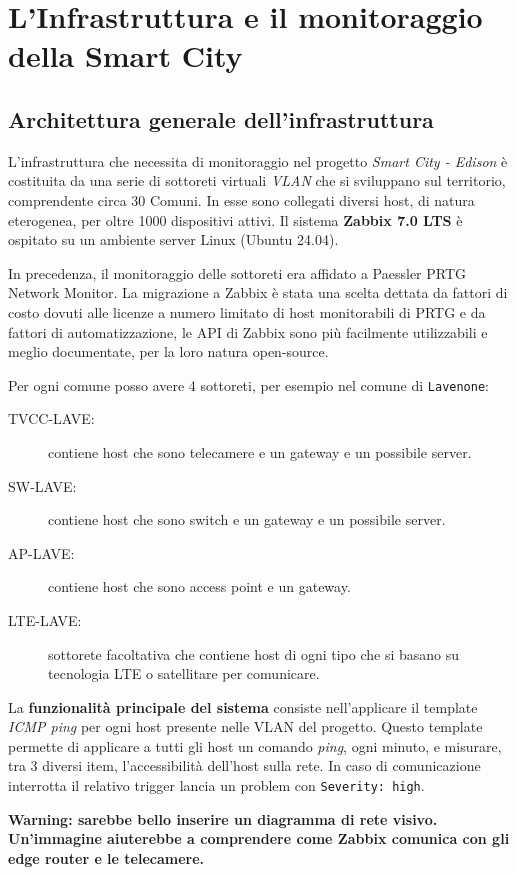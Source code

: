 \documentclass[12pt, a4paper]{report}
\begin{document}
\chapter{L'Infrastruttura e il  monitoraggio della Smart City}

\section{Architettura generale dell'infrastruttura}
L'infrastruttura che necessita di monitoraggio nel progetto \emph{Smart City - Edison} 
è costituita da una serie di sottoreti virtuali \emph{VLAN} che si sviluppano sul territorio, 
comprendente circa 30 Comuni. In esse sono collegati diversi host, di natura eterogenea,
per oltre 1000 dispositivi attivi. 
Il sistema \textbf{Zabbix 7.0 LTS} è
ospitato su un ambiente server Linux (Ubuntu 24.04).

In precedenza, il monitoraggio delle sottoreti era affidato a Paessler PRTG Network Monitor.
La migrazione a Zabbix è stata una scelta dettata da fattori di costo dovuti alle licenze a numero limitato 
di host monitorabili di PRTG e da fattori di automatizzazione, le API di Zabbix sono 
più facilmente utilizzabili e meglio documentate, per la loro natura open-source.

Per ogni comune posso avere 4 sottoreti, per esempio nel comune di \lstinline|Lavenone|:
\begin{description}
    \item [TVCC-LAVE:] contiene host che sono telecamere e un gateway e un possibile server.
    \item [SW-LAVE: ]contiene host che sono switch e un gateway e un possibile server.
    \item [AP-LAVE: ]contiene host che sono access point e un gateway.
    \item [LTE-LAVE:] sottorete facoltativa che contiene host di ogni tipo che si basano su 
    tecnologia LTE o satellitare per comunicare.
\end{description}

La \textbf{funzionalità principale del sistema} consiste nell'applicare il template \emph{ICMP ping}
per ogni host presente nelle VLAN del progetto.
Questo template permette di applicare a tutti gli host un comando \emph{ping}, ogni minuto, e misurare,
tra 3 diversi item, l'accessibilità dell'host sulla rete. In caso di comunicazione interrotta 
il relativo trigger lancia un problem con \lstinline|Severity: high|.

\textbf{Warning: sarebbe bello inserire un diagramma di rete visivo.  
Un'immagine aiuterebbe a comprendere come Zabbix comunica con gli edge router e le telecamere.}
\end{document}
